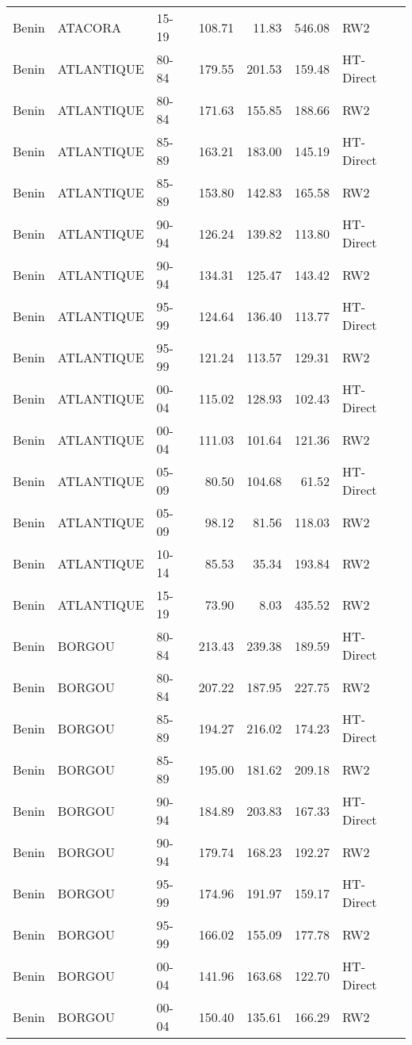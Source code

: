 \begin{longtable}{lllrrrl}
  Benin & ATACORA & 15-19 & 108.71 & 11.83 & 546.08 & RW2 \\ 
  Benin & ATLANTIQUE & 80-84 & 179.55 & 201.53 & 159.48 & HT-Direct \\ 
  Benin & ATLANTIQUE & 80-84 & 171.63 & 155.85 & 188.66 & RW2 \\ 
  Benin & ATLANTIQUE & 85-89 & 163.21 & 183.00 & 145.19 & HT-Direct \\ 
  Benin & ATLANTIQUE & 85-89 & 153.80 & 142.83 & 165.58 & RW2 \\ 
  Benin & ATLANTIQUE & 90-94 & 126.24 & 139.82 & 113.80 & HT-Direct \\ 
  Benin & ATLANTIQUE & 90-94 & 134.31 & 125.47 & 143.42 & RW2 \\ 
  Benin & ATLANTIQUE & 95-99 & 124.64 & 136.40 & 113.77 & HT-Direct \\ 
  Benin & ATLANTIQUE & 95-99 & 121.24 & 113.57 & 129.31 & RW2 \\ 
  Benin & ATLANTIQUE & 00-04 & 115.02 & 128.93 & 102.43 & HT-Direct \\ 
  Benin & ATLANTIQUE & 00-04 & 111.03 & 101.64 & 121.36 & RW2 \\ 
  Benin & ATLANTIQUE & 05-09 & 80.50 & 104.68 & 61.52 & HT-Direct \\ 
  Benin & ATLANTIQUE & 05-09 & 98.12 & 81.56 & 118.03 & RW2 \\ 
  Benin & ATLANTIQUE & 10-14 & 85.53 & 35.34 & 193.84 & RW2 \\ 
  Benin & ATLANTIQUE & 15-19 & 73.90 & 8.03 & 435.52 & RW2 \\ 
  Benin & BORGOU & 80-84 & 213.43 & 239.38 & 189.59 & HT-Direct \\ 
  Benin & BORGOU & 80-84 & 207.22 & 187.95 & 227.75 & RW2 \\ 
  Benin & BORGOU & 85-89 & 194.27 & 216.02 & 174.23 & HT-Direct \\ 
  Benin & BORGOU & 85-89 & 195.00 & 181.62 & 209.18 & RW2 \\ 
  Benin & BORGOU & 90-94 & 184.89 & 203.83 & 167.33 & HT-Direct \\ 
  Benin & BORGOU & 90-94 & 179.74 & 168.23 & 192.27 & RW2 \\ 
  Benin & BORGOU & 95-99 & 174.96 & 191.97 & 159.17 & HT-Direct \\ 
  Benin & BORGOU & 95-99 & 166.02 & 155.09 & 177.78 & RW2 \\ 
  Benin & BORGOU & 00-04 & 141.96 & 163.68 & 122.70 & HT-Direct \\ 
  Benin & BORGOU & 00-04 & 150.40 & 135.61 & 166.29 & RW2 \\ 

\end{longtable}
